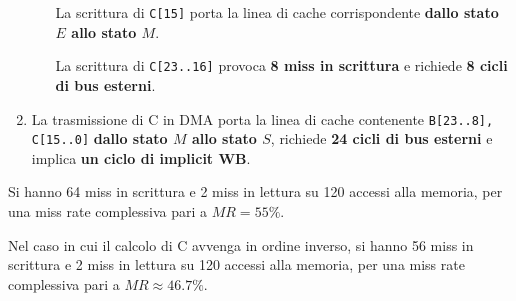 \documentclass[a4paper]{article}
\begin{document}
\begin{enumerate}
\begin{itemize}
La scrittura di \texttt{C[15]} porta la linea di cache corrispondente \textbf{dallo stato $E$ allo stato $M$}.

La scrittura di \texttt{C[23..16]} provoca \textbf{8 miss in scrittura} e richiede \textbf{8 cicli di bus esterni}.

\end{itemize}

\item La trasmissione di C in DMA porta la linea di cache contenente \texttt{B[23..8], C[15..0]} \textbf{dallo stato $M$ allo stato $S$}, richiede \textbf{24 cicli di bus esterni} e implica \textbf{un ciclo di implicit WB}.
\end{enumerate}

Si hanno 64 miss in scrittura e 2 miss in lettura su 120 accessi alla memoria, per una miss rate complessiva pari a $MR = 55\%$.

Nel caso in cui il calcolo di C avvenga in ordine inverso, si hanno 56 miss in scrittura e 2 miss in lettura su 120 accessi alla memoria, per una miss rate complessiva pari a $MR \approx 46.7\%$.
\end{document}
